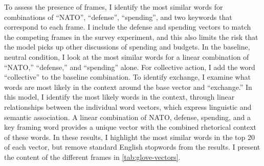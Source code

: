 \documentclass[12pt]{article}
\begin{document}
To assess the presence of frames, I identify the most similar words for combinations of ``NATO'', ``defense'', ``spending'', and two keywords that correspond to each frame. 
I include the defense and spending vectors to match the competing frames in the survey experiment, and this also limits the risk that the model picks up other discussions of spending and budgets. 
In the baseline, neutral condition, I look at the most similar words for a linear combination of ``NATO,'' ``defense,'' and ``spending'' alone.  
For collective action, I add the word ``collective'' to the baseline combination. 
To identify exchange, I examine what words are most likely in the context around the base vector and ``exchange.''
In this model, I identify the most likely words in the context, through linear relationships between the individual word vectors, which express linguistic and semantic association. 
A linear combination of NATO, defense, spending, and a key framing word provides a unique vector with the combined rhetorical context of these words. 
In these results, I highlight the most similar words in the top 20 of each vector, but remove standard English stopwords from the results. 
I present the content of the different frames in \autoref{tab:glove-vectors}.  
\end{document}
